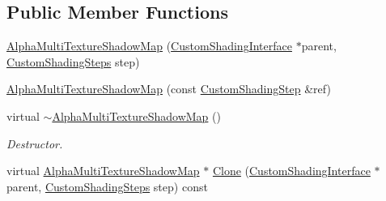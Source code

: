 \subsection*{Public Member Functions}
\begin{DoxyCompactItemize}
\item 
\mbox{\hyperlink{class_geometry_engine_1_1_custom_shading_1_1_alpha_multi_texture_shadow_map_aa6616681ccdc61e9ad0e8996a80c0f1e}{Alpha\+Multi\+Texture\+Shadow\+Map}} (\mbox{\hyperlink{class_geometry_engine_1_1_custom_shading_1_1_custom_shading_interface}{Custom\+Shading\+Interface}} $\ast$parent, \mbox{\hyperlink{namespace_geometry_engine_1_1_custom_shading_a2dc236a5b567da5099069ce2b2be5609}{Custom\+Shading\+Steps}} step)
\item 
\mbox{\hyperlink{class_geometry_engine_1_1_custom_shading_1_1_alpha_multi_texture_shadow_map_ab099c9b9c3aab8ef5e2448b9aebe0f78}{Alpha\+Multi\+Texture\+Shadow\+Map}} (const \mbox{\hyperlink{class_geometry_engine_1_1_custom_shading_1_1_custom_shading_step}{Custom\+Shading\+Step}} \&ref)
\item 
\mbox{\label{class_geometry_engine_1_1_custom_shading_1_1_alpha_multi_texture_shadow_map_abee0cc1836b2bd09e8c14ec75b74da59}} 
virtual \mbox{\hyperlink{class_geometry_engine_1_1_custom_shading_1_1_alpha_multi_texture_shadow_map_abee0cc1836b2bd09e8c14ec75b74da59}{$\sim$\+Alpha\+Multi\+Texture\+Shadow\+Map}} ()
\begin{DoxyCompactList}\small\item\em Destructor. \end{DoxyCompactList}\item 
virtual \mbox{\hyperlink{class_geometry_engine_1_1_custom_shading_1_1_alpha_multi_texture_shadow_map}{Alpha\+Multi\+Texture\+Shadow\+Map}} $\ast$ \mbox{\hyperlink{class_geometry_engine_1_1_custom_shading_1_1_alpha_multi_texture_shadow_map_a7a62881619d6247fee10fb74d4fc79e2}{Clone}} (\mbox{\hyperlink{class_geometry_engine_1_1_custom_shading_1_1_custom_shading_interface}{Custom\+Shading\+Interface}} $\ast$parent, \mbox{\hyperlink{namespace_geometry_engine_1_1_custom_shading_a2dc236a5b567da5099069ce2b2be5609}{Custom\+Shading\+Steps}} step) const
\end{DoxyCompactItemize}
